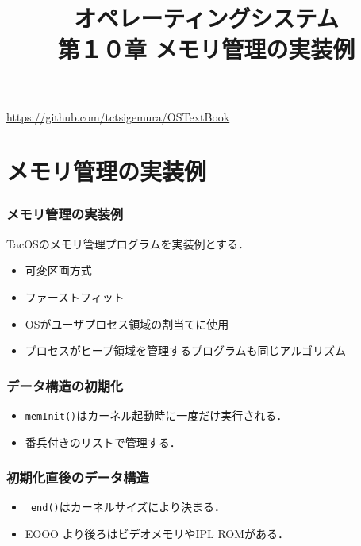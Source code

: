 \documentclass{beamer}                   %
\begin{document}
\title[メモ管理の実装例]{オペレーティングシステム\\第１０章 メモリ管理の実装例}
\date{}

\begin{frame}
  \titlepage
  \centerline{\url{https://github.com/tctsigemura/OSTextBook}}
\end{frame}


\section{メモリ管理の実装例}
\begin{frame}
  \frametitle{メモリ管理の実装例}
  TacOSのメモリ管理プログラムを実装例とする．
  \begin{itemize}
  \item 可変区画方式
  \item ファーストフィット
  \item OSがユーザプロセス領域の割当てに使用
  \item プロセスがヒープ領域を管理するプログラムも同じアルゴリズム
  \end{itemize}
\end{frame}

\begin{frame}
  \frametitle{データ構造の初期化}
  \begin{itemize}
  \item {\tt memInit()}はカーネル起動時に一度だけ実行される．
  \item 番兵付きのリストで管理する．
  \end{itemize}
\end{frame}

\begin{frame}
  \frametitle{初期化直後のデータ構造}
  \begin{itemize}
  \item {\tt \_end()}はカーネルサイズにより決まる．
  \item EOOO より後ろはビデオメモリやIPL ROMがある．
  \end{itemize}
\end{frame}
\end{document}
